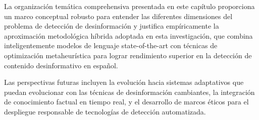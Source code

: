 La organización temática comprehensiva presentada en este capítulo proporciona un marco conceptual robusto para entender las diferentes dimensiones del problema de detección de desinformación y justifica empíricamente la aproximación metodológica híbrida adoptada en esta investigación, que combina inteligentemente modelos de lenguaje state-of-the-art con técnicas de optimización metaheurística para lograr rendimiento superior en la detección de contenido desinformativo en español.

Las perspectivas futuras incluyen la evolución hacia sistemas adaptativos que puedan evolucionar con las técnicas de desinformación cambiantes, la integración de conocimiento factual en tiempo real, y el desarrollo de marcos éticos para el despliegue responsable de tecnologías de detección automatizada.